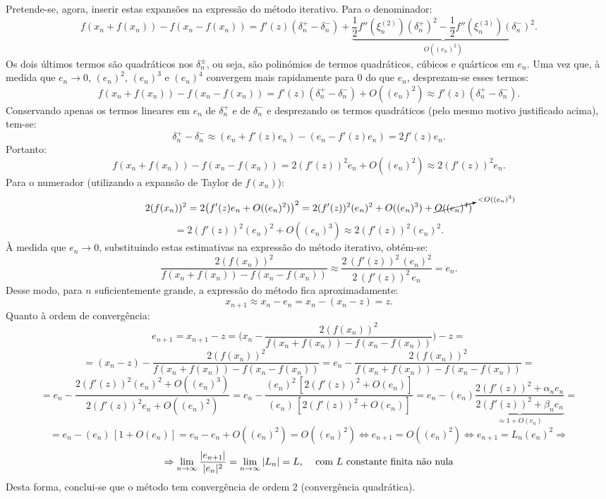 \newline
Pretende-se, agora, inserir estas expansões na expressão do método iterativo.
\newpage
\noindent Para o denominador:
\[ f(x_n + f(x_n)) - f(x_n - f(x_n))
= f'(z) (\delta_n^+ - \delta_n^-) + \underbrace{\frac{1}{2} f''(\xi_n^{(2)}) (\delta_n^+)^2 - \frac{1}{2} f''(\xi_n^{(3)}) (\delta_n^-)^2}_{O((e_n)^2)}. \]
Os dois últimos termos são quadráticos nos \(\delta_n^\pm\), ou seja, são polinómios de termos quadráticos, cúbicos e quárticos em \(e_n\). Uma vez que, à medida que \(e_n \to 0\), \((e_n)^2\), \((e_n)^3\) e \((e_n)^4\) convergem mais rapidamente para 0 do que \(e_n\), desprezam-se esses termos:
\[ f(x_n + f(x_n)) - f(x_n - f(x_n))
= f'(z) (\delta_n^+ - \delta_n^-) + O((e_n)^2)
\approx f'(z) (\delta_n^+ - \delta_n^-).\]
Conservando apenas os termos lineares em \(e_n\) de \(\delta_n^+\) e de \(\delta_n^-\) e desprezando os termos quadráticos (pelo mesmo motivo justificado acima), tem-se:
\[ \delta_n^+ - \delta_n^-
\approx (e_n + f'(z) e_n) - (e_n - f'(z) e_n)
= 2 f'(z) e_n.\]
Portanto:
\[ f(x_n + f(x_n)) - f(x_n - f(x_n))
= 2 (f'(z))^2 e_n + O((e_n)^2)
\approx 2 (f'(z))^2 e_n.\]
\newline
Para o numerador (utilizando a expansão de Taylor de \(f(x_n)\)):
\[ 2(f(x_n))^2
= 2 \big(f'(z) e_n + O((e_n)^2)\big)^2
= 2 (f'(z))^2 (e_n)^2 + O((e_n)^3) + \cancelto{\scriptstyle <O((e_n)^3)}{O((e_n)^4)}\]
\[= 2 (f'(z))^2 (e_n)^2 + O((e_n)^3)
\approx 2 (f'(z))^2 (e_n)^2.\]
\newline
À medida que \(e_n \to 0\), substituindo estas estimativas na expressão do método iterativo, obtém-se:
\[ \frac{2 (f(x_n))^2}
        {f(x_n + f(x_n)) - f(x_n - f(x_n))}
\approx \frac{2 \, (f'(z))^2 \, (e_n)^2}
             {2 \, (f'(z))^2 \, e_n}
= e_n. \]
Desse modo, para \(n\) suficientemente grande, a expressão do método fica aproximadamente:
\[ x_{n+1} \approx x_n - e_n = x_n - (x_n - z) = z.\]
Quanto à ordem de convergência:
\[ e_{n+1} = x_{n+1} - z
= \Big(x_n - \frac{2 (f(x_n))^2}{f(x_n + f(x_n)) - f(x_n - f(x_n))}\Big) - z = \]
\[ = (x_n - z) - \frac{2 (f(x_n))^2}{f(x_n + f(x_n)) - f(x_n - f(x_n))}
= e_n - \frac{2 (f(x_n))^2}{f(x_n + f(x_n)) - f(x_n - f(x_n))} = \]
\[ = e_n - \frac{2 (f'(z))^2 (e_n)^2 + O((e_n)^3)}{2 (f'(z))^2 e_n + O((e_n)^2)}
= e_n - \frac{(e_n)^2 \, [2 (f'(z))^2 + O(e_n)]}{(e_n) \, [2 (f'(z))^2 + O(e_n)]}
= e_n - (e_n) \underbrace{\frac{2 (f'(z))^2 + \alpha_n e_n}{2 (f'(z))^2 + \beta_n e_n}}_{\approx 1 + O(e_n)} = \]
\[= e_n - (e_n) \, [1 + O(e_n)]
= e_n - e_n + O((e_n)^2) = O((e_n)^2)
\Leftrightarrow e_{n+1} = O((e_n)^2)
\Leftrightarrow e_{n+1} = L_n (e_n)^2 \Rightarrow \]
\[ \Rightarrow \lim_{n \to \infty} \frac{|e_{n+1}|}{|e_n|^2}
= \lim_{n \to \infty} |L_n| = L \text{, \quad com \(L\) constante finita não nula}\]
Desta forma, conclui-se que o método tem convergência de ordem 2 (convergência quadrática).